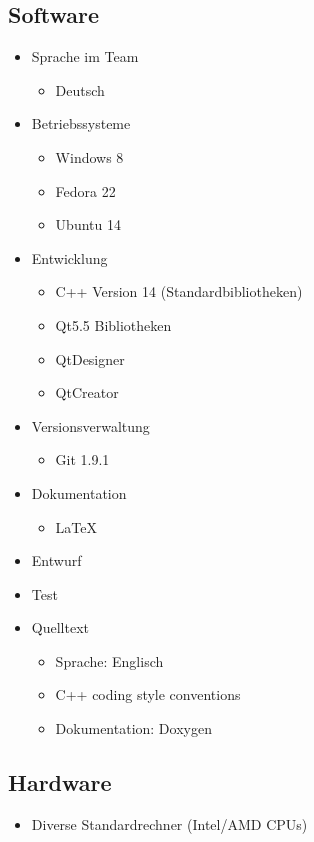 \subsection{Software}
\begin{itemize}
\item Sprache im Team
	\begin{itemize}[label={--}]
		\item Deutsch
	\end{itemize}
\item Betriebssysteme
	\begin{itemize}[label={--}]
		\item Windows 8
		\item Fedora 22
		\item Ubuntu 14
	\end{itemize}
\item Entwicklung
	\begin{itemize}[label={--}]
		\item C++ Version 14 (Standardbibliotheken)
		\item Qt5.5 Bibliotheken
		\item QtDesigner
		\item QtCreator
	\end{itemize}
\item Versionsverwaltung
	\begin{itemize}[label={--}]
		\item Git 1.9.1
	\end{itemize}
\item Dokumentation
	\begin{itemize}[label={--}]
		\item LaTeX
	\end{itemize}
	
\item Entwurf
\item Test

\item Quelltext
	\begin{itemize}[label={--}]
		\item Sprache: Englisch
		\item C++ coding style conventions
		\item Dokumentation: Doxygen
	\end{itemize}
\end{itemize}

\subsection{Hardware}
\begin{itemize}
	\item Diverse Standardrechner (Intel/AMD CPUs)
\end{itemize}
